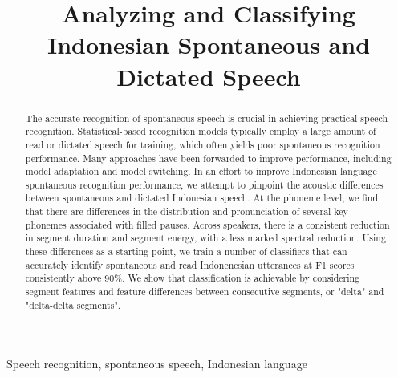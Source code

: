 \documentclass[conference]{IEEEtran}
\begin{document}
\title{Analyzing and Classifying Indonesian Spontaneous and Dictated Speech}

\author {
}
\maketitle

\pagestyle{fancy}%
\thispagestyle{firstpage}


\begin{abstract}
The accurate recognition of spontaneous speech is crucial in achieving practical speech recognition.
Statistical-based recognition models typically employ a large amount of read or dictated speech for training, which often yields poor spontaneous recognition performance.
Many approaches have been forwarded to improve performance, including model adaptation and model switching.
In an effort to improve Indonesian language spontaneous recognition performance, we attempt to pinpoint the acoustic differences between spontaneous and dictated Indonesian speech.
At the phoneme level, we find that there are differences in the distribution and pronunciation of several key phonemes associated with filled pauses.
Across speakers, there is a consistent reduction in segment duration and segment energy, with a less marked spectral reduction.
Using these differences as a starting point, we train a number of classifiers that can accurately identify spontaneous and read Indonenesian utterances at F1 scores consistently above 90\%.
We show that classification is achievable by considering segment features and feature differences between consecutive segments, or "delta" and "delta-delta segments".
\end{abstract}

\begin{IEEEkeywords}
Speech recognition, spontaneous speech, Indonesian language
\end{IEEEkeywords}
\end{document}
